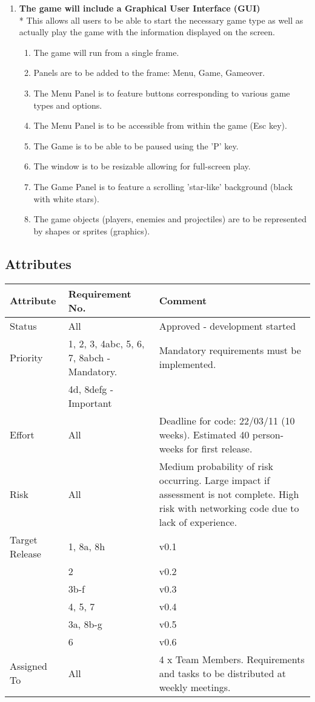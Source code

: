 \begin{enumerate}
\item \textbf{The game will include a Graphical User Interface (GUI)}
\\* This allows all users to be able to start the necessary game type as well as actually play the game with the information displayed on the screen.
\begin{enumerate}
\item The game will run from a single frame.
\item Panels are to be added to the frame: Menu, Game, Gameover.
\item The Menu Panel is to feature buttons corresponding to various game types and options.
\item The Menu Panel is to be accessible from within the game (Esc key).
\item The Game is to be able to be paused using the 'P' key.
\item The window is to be resizable allowing for full-screen play.
\item The Game Panel is to feature a scrolling 'star-like' background (black with white stars).
\item The game objects (players, enemies and projectiles) are to be represented by shapes or sprites (graphics).
\end{enumerate}

\end{enumerate}


\subsection{Attributes}
\label{sec: req_attributes}

\noindent\begin{tabular}{| l || p{6cm} | p{7cm} |}\hline
  \textbf{Attribute} & \textbf{Requirement No.} & \textbf{Comment}  \\\hline\hline
  Status & All & Approved - development started \\\hline
 Priority & 1, 2, 3, 4abc, 5, 6, 7, 8abch  - Mandatory. &  Mandatory requirements must be implemented.\\
 & 4d, 8defg - Important & \\\hline
 Effort & All & Deadline for code: 22/03/11 (10 weeks). Estimated 40 person-weeks for first release. \\\hline
 Risk & All & Medium probability of risk occurring. Large impact if assessment is not complete. High risk with networking code due to lack of experience. \\\hline
 Target Release & 1, 8a, 8h & v0.1 \\
 & 2 & v0.2 \\
 & 3b-f & v0.3 \\
 & 4, 5, 7 & v0.4 \\
 & 3a, 8b-g & v0.5 \\
 & 6 & v0.6 \\\hline
 Assigned To & All & 4 x Team Members. Requirements and tasks to be distributed at weekly meetings. \\\hline
\end{tabular}\vspace*{1cm}



